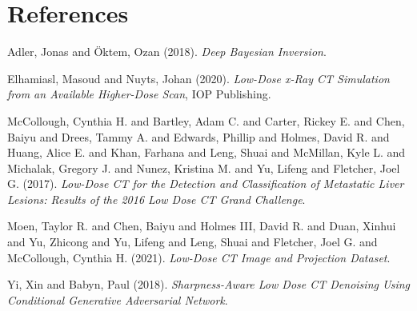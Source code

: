 \documentclass[a4paper, 11pt]{article}
\begin{document}
\section{References}
\label{sec:orgbb6b46e}
\noindent
Adler, Jonas and Öktem, Ozan (2018). \emph{Deep {{Bayesian Inversion}}}.

\noindent
Elhamiasl, Masoud and Nuyts, Johan (2020). \emph{Low-Dose x-Ray {{CT}} Simulation from an Available Higher-Dose Scan}, IOP Publishing.

\noindent
McCollough, Cynthia H. and Bartley, Adam C. and Carter, Rickey E. and Chen, Baiyu and Drees, Tammy A. and Edwards, Phillip and Holmes, David R. and Huang, Alice E. and Khan, Farhana and Leng, Shuai and McMillan, Kyle L. and Michalak, Gregory J. and Nunez, Kristina M. and Yu, Lifeng and Fletcher, Joel G. (2017). \emph{Low-Dose {{CT}} for the Detection and Classification of Metastatic Liver Lesions: {{Results}} of the 2016 {{Low Dose CT Grand Challenge}}}.

\noindent
Moen, Taylor R. and Chen, Baiyu and Holmes III, David R. and Duan, Xinhui and Yu, Zhicong and Yu, Lifeng and Leng, Shuai and Fletcher, Joel G. and McCollough, Cynthia H. (2021). \emph{Low-Dose {{CT}} Image and Projection Dataset}.

\noindent
Yi, Xin and Babyn, Paul (2018). \emph{Sharpness-Aware {{Low}} Dose {{CT}} Denoising Using Conditional Generative Adversarial Network}.
\end{document}
